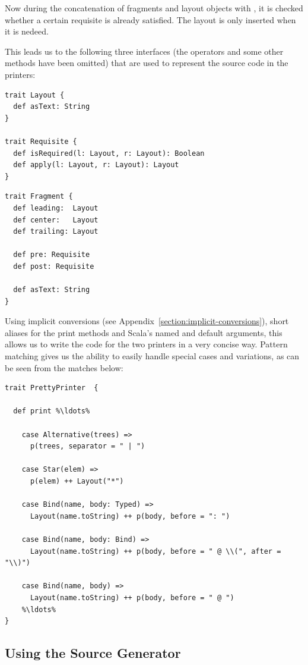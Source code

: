 Now during the concatenation of fragments and layout objects with \src{++}, it is checked whether a certain requisite is already satisfied. The  layout is only inserted when it is nedeed.

This leads us to the following three interfaces (the \src{++} operators and some other methods have been omitted) that are used to represent the source code in the printers:

\begin{lstlisting}
trait Layout {
  def asText: String
}

trait Requisite {  
  def isRequired(l: Layout, r: Layout): Boolean
  def apply(l: Layout, r: Layout): Layout
}
\end{lstlisting}
\begin{lstlisting}
trait Fragment {
  def leading:  Layout
  def center:   Layout
  def trailing: Layout
  
  def pre: Requisite
  def post: Requisite
  
  def asText: String
}
\end{lstlisting}

Using implicit conversions (see Appendix~\vref{section:implicit-conversions}), short aliases for the print methods and Scala's named and default arguments, this allows us to write the code for the two printers in a very concise way. Pattern matching gives us the ability to easily handle special cases and variations, as can be seen from the  matches below:

\begin{lstlisting}
trait PrettyPrinter  {
  
  def print %\ldots%  

    case Alternative(trees) =>
      p(trees, separator = " | ")
      
    case Star(elem) =>
      p(elem) ++ Layout("*")
      
    case Bind(name, body: Typed) =>
      Layout(name.toString) ++ p(body, before = ": ")

    case Bind(name, body: Bind) =>
      Layout(name.toString) ++ p(body, before = " @ \\(", after = "\\)")
      
    case Bind(name, body) =>
      Layout(name.toString) ++ p(body, before = " @ ")
    %\ldots%
}
\end{lstlisting}

\subsection{Using the Source Generator}

